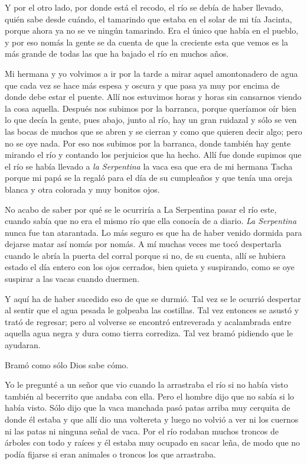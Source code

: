 \begin{pages}
\begin{Leftside}
		\pstart
			Y por el otro lado, por donde está el recodo, el río se debía de haber llevado, quién sabe desde cuándo, el tamarindo que estaba en el solar de mi tía Jacinta, porque ahora ya no se ve ningún tamarindo. Era el único que había en el pueblo, y por eso nomás la gente se da cuenta de que la creciente esta que vemos es la más grande de todas las que ha bajado el río en muchos años.
		\pend

		\pstart
			Mi hermana y yo volvimos a ir por la tarde a mirar aquel amontonadero de agua que cada vez se hace más espesa y oscura y que pasa ya muy por encima de donde debe estar el puente. Allí nos estuvimos horas y horas sin cansarnos viendo la cosa aquella. Después nos subimos por la barranca, porque queríamos oír bien lo que decía la gente, pues abajo, junto al río, hay un gran ruidazal y sólo se ven las bocas de muchos que se abren y se cierran y como que quieren decir algo; pero no se oye nada. Por eso nos subimos por la barranca, donde también hay gente mirando el río y contando los perjuicios que ha hecho. Allí fue donde supimos que el río se había llevado a \textit{la Serpentina} la vaca esa que era de mi hermana Tacha porque mi papá se la regaló para el día de su cumpleaños y que tenía una oreja blanca y otra colorada y muy bonitos ojos.
		\pend

		\pstart
			No acabo de saber por qué se le ocurriría a La Serpentina pasar el río este, cuando sabía que no era el mismo río que ella conocía de a diario. \textit{La Serpentina} nunca fue tan atarantada. Lo más seguro es que ha de haber venido dormida para dejarse matar así nomás por nomás. A mí muchas veces me tocó despertarla cuando le abría la puerta del corral porque si no, de su cuenta, allí se hubiera estado el día entero con los ojos cerrados, bien quieta y suspirando, como se oye suspirar a las vacas cuando duermen.
		\pend

		\pstart
			Y aquí ha de haber sucedido eso de que se durmió. Tal vez se le ocurrió despertar al sentir que el agua pesada le golpeaba las costillas. Tal vez entonces se asustó y trató de regresar; pero al volverse se encontró entreverada y acalambrada entre aquella agua negra y dura como tierra corrediza. Tal vez bramó pidiendo que le ayudaran.
		\pend

		\pstart
			Bramó como sólo Dios sabe cómo.
		\pend

		\pstart
			Yo le pregunté a un señor que vio cuando la arrastraba el río si no había visto también al becerrito que andaba con ella. Pero el hombre dijo que no sabía si lo había visto. Sólo dijo que la vaca manchada pasó patas arriba muy cerquita de donde él estaba y que allí dio una voltereta y luego no volvió a ver ni los cuernos ni las patas ni ninguna señal de vaca. Por el río rodaban muchos troncos de árboles con todo y raíces y él estaba muy ocupado en sacar leña, de modo que no podía fijarse si eran animales o troncos los que arrastraba.
		\pend


\end{Leftside}
\end{pages}
